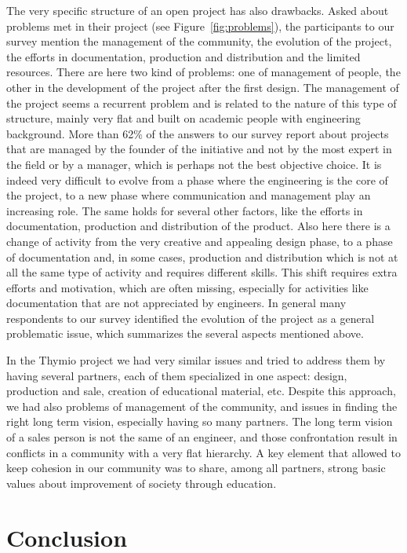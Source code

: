 \documentclass[letterpaper, 10 pt, conference]{ieeeconf}  %
\begin{document}
The very specific structure of an open project has also drawbacks. 
Asked about problems met in their project (see Figure~\ref{fig:problems}), the participants to our survey mention the management of the community, the evolution of the project, the efforts in documentation, production and distribution and the limited resources.
There are here two kind of problems: one of management of people, the other in the development of the project after the first design.
The management of the project seems a recurrent problem and is related to the nature of this type of structure, mainly very flat and built on academic people with engineering background. 
More than 62\% of the answers to our survey report about projects that are managed by the founder of the initiative and not by the most expert in the field or by a manager, which is perhaps not the best objective choice.
It is indeed very difficult to evolve from a phase where the engineering is the core of the project, to a new phase where communication and management play an increasing role.
The same holds for several other factors, like the efforts in documentation, production and distribution of the product. 
Also here there is a change of activity from the very creative and appealing design phase, to a phase of documentation and, in some cases, production and distribution which is not at all the same type of activity and requires different skills.
This shift requires extra efforts and motivation, which are often missing, especially for activities like documentation that are not appreciated by engineers.
In general many respondents to our survey identified the evolution of the project as a general problematic issue, which summarizes the several aspects mentioned above.

In the Thymio project we had very similar issues and tried to address them by having several partners, each of them specialized in one aspect: design, production and sale, creation of educational material, etc.
Despite this approach, we had also problems of management of the community, and issues in finding the right long term vision, especially having so many partners. 
The long term vision of a sales person is not the same of an engineer, and those confrontation result in conflicts in a community with a very flat hierarchy. 
A key element that allowed to keep cohesion in our community was to share, among all partners, strong basic values about improvement of society through education.


\section{Conclusion}
\end{document}
